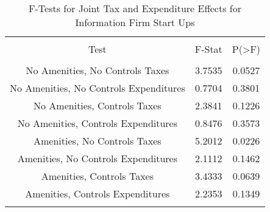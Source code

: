 
\begin{table}[!htbp] \centering 
  \caption{F-Tests for Joint Tax and Expenditure Effects for Information Firm Start Ups} 
  \label{51Ftests} 
\begin{tabular}{@{\extracolsep{5pt}} ccc} 
\\[-1.8ex]\hline 
\hline \\[-1.8ex] 
Test & F-Stat & P(\textgreater F) \\ 
\hline \\[-1.8ex] 
No Amenities, No Controls Taxes & 3.7535 & 0.0527 \\ 
No Amenities, No Controls Expenditures & 0.7704 & 0.3801 \\ 
No Amenities, Controls Taxes & 2.3841 & 0.1226 \\ 
No Amenities, Controls Expenditures & 0.8476 & 0.3573 \\ 
Amenities, No Controls Taxes & 5.2012 & 0.0226 \\ 
Amenities, No Controls Expenditures & 2.1112 & 0.1462 \\ 
Amenities, Controls Taxes & 3.4333 & 0.0639 \\ 
Amenities, Controls Expenditures & 2.2353 & 0.1349 \\ 
\hline \\[-1.8ex] 
\end{tabular} 
\end{table} 
